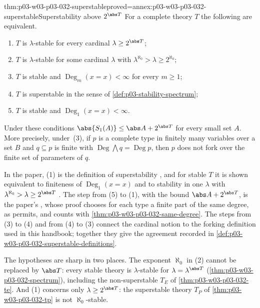 \begin{hbtheorem}{thm:p03-w03-p03-032-superstable}{proved=annex:p03-w03-p03-032-superstable}{Superstability above \(2^{\abs T}\)}
For a complete theory \(T\) the following are equivalent.
\begin{enumerate}
  \item \(T\) is \(\lambda\)-stable for every cardinal
        \(\lambda\geq2^{\abs T}\);
  \item \(T\) is \(\lambda\)-stable for some cardinal \(\lambda\) with
        \(\lambda^{\aleph_0}>\lambda\geq2^{\aleph_0}\);
  \item \(T\) is stable and \(\operatorname{Deg}_m(x=x)<\infty\) for every
        \(m\geq1\);
  \item \(T\) is superstable in the sense of
        \cref{def:p03-stability-spectrum};
  \item \(T\) is stable and \(\operatorname{Deg}_1(x=x)<\infty\).
\end{enumerate}
Under these conditions \(\abs{S_1(A)}\leq\abs A+2^{\abs T}\) for every small
set \(A\).  More precisely, under~(3), if \(p\) is a complete type in
finitely many variables over a set \(B\) and \(q\subseteq p\) is finite with
\(\operatorname{Deg}\bigwedge q=\operatorname{Deg}p\), then \(p\) does not
fork over the finite set of parameters of \(q\).
\end{hbtheorem}

In the paper, (1) is the definition of superstability
\cite[\S~0, p.~273]{Shelah1971Stability}, and for stable \(T\) it is shown
equivalent to finiteness of \(\operatorname{Deg}_1(x=x)\) and to stability
in one \(\lambda\) with \(\lambda^{\aleph_0}>\lambda\geq2^{\abs T}\)
\cite[Corollary~6.10, pp.~357--358]{Shelah1971Stability}.  The step from
(5) to (1), with the bound \(\abs A+2^{\abs T}\), is the paper's
\cite[Theorem~6.9, p.~357]{Shelah1971Stability}, whose proof chooses for
each type a finite part of the same degree, as
\cite[Lemma~6.2\,(B), p.~348]{Shelah1971Stability} permits, and counts
with \cref{thm:p03-w03-p03-032-same-degree}.  The steps from (3) to (4)
and from (4) to (3) connect the cardinal notion to the forking definition
used in this handbook; together they give the agreement recorded in
\cref{def:p03-w03-p03-032-superstable-definitions}.

The hypotheses are sharp in two places.  The exponent \(\aleph_0\) in (2)
cannot be replaced by \(\abs T\): every stable theory is \(\lambda\)-stable
for \(\lambda=\lambda^{\abs T}\) (\cref{thm:p03-w03-p03-032-spectrum}),
including the non-superstable \(T_E\) of \cref{thm:p03-w03-p03-032-te}.  And
(1) concerns only \(\lambda\geq2^{\abs T}\): the superstable theory \(T_P\)
of \cref{thm:p03-w03-p03-032-tp} is not \(\aleph_0\)-stable.

